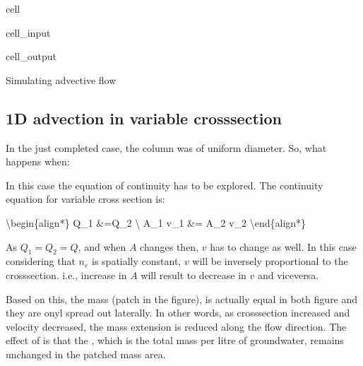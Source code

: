 \documentclass[letterpaper,10pt,english]{jupyterBook}
\begin{document}
\begin{sphinxuseclass}{cell}
\begin{sphinxVerbatimInput}
\begin{sphinxuseclass}{cell_input}
\end{sphinxuseclass}\end{sphinxVerbatimInput}
\begin{sphinxVerbatimOutput}

\begin{sphinxuseclass}{cell_output}
\begin{sphinxVerbatim}[commandchars=\\\{\}]
Simulating advective flow
\end{sphinxVerbatim}

\noindent{}

\end{sphinxuseclass}\end{sphinxVerbatimOutput}

\end{sphinxuseclass}

\subsection{1D advection in variable cross\sphinxhyphen{}section}
\label{\detokenize{content/transport/L9/21_conservative_transport:d-advection-in-variable-cross-section}}
\sphinxAtStartPar
In the just completed case, the column was of uniform diameter. So, what happens when:

\sphinxAtStartPar
In this case the equation of continuity has to be explored. The continuity equation for variable cross section is:

\sphinxAtStartPar
\textbackslash{}begin\{align*\}
Q\_1 \&=Q\_2 \textbackslash{}
A\_1 v\_1 \&= A\_2 v\_2
\textbackslash{}end\{align*\}

\sphinxAtStartPar
As \(Q_1=Q_2= Q\), and when \(A\) changes then, \(v\) has to change as well. In this case considering that \(n_e\) is spatially constant, \(v\) will be inversely proportional to the cross\sphinxhyphen{}section. i.e., increase in \(A\) will result to decrease in \(v\) and vice\sphinxhyphen{}versa.

\sphinxAtStartPar
Based on this, the mass (patch in the figure), is actually equal in both figure and they are onyl spread out laterally. In other words, as cross\sphinxhyphen{}section increased and velocity decreased, the mass extension is reduced along the flow direction. The effect of  is that the , which is the total mass per litre of groundwater, remains unchanged in the patched mass area.
\end{document}
